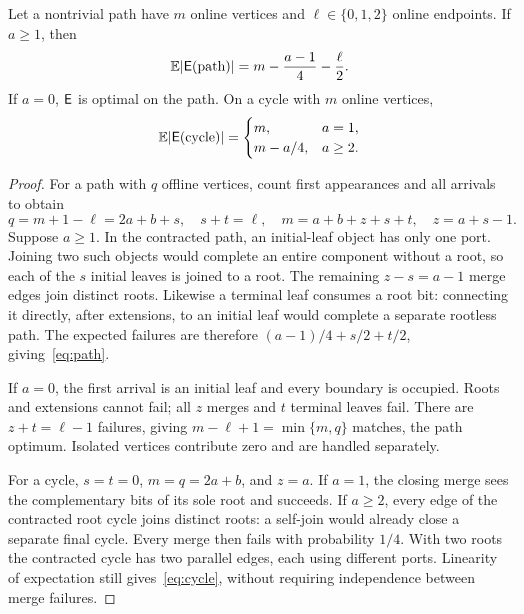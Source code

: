 \begin{lemma}\label{lem:expectations}
Let a nontrivial path have $m$ online vertices and $\ell\in\{0,1,2\}$
online endpoints. If $a\ge1$, then
\begin{equation}\label{eq:path}
 \mathbb E|\mathsf{E}(\text{path})|=m-\frac{a-1}{4}-\frac{\ell}{2}.
\end{equation}
If $a=0$, $\mathsf{E}$ is optimal on the path. On a cycle with $m$ online
vertices,
\begin{equation}\label{eq:cycle}
 \mathbb E|\mathsf{E}(\text{cycle})|=
 \begin{cases}m,&a=1,\\m-a/4,&a\ge2.\end{cases}
\end{equation}
\end{lemma}
\begin{proof}
For a path with $q$ offline vertices, count first appearances and all
arrivals to obtain
\begin{equation}\label{eq:counts}
 q=m+1-\ell=2a+b+s,\quad s+t=\ell,\quad
 m=a+b+z+s+t,\quad z=a+s-1.
\end{equation}
Suppose $a\ge1$. In the contracted path, an initial-leaf object has only
one port. Joining two such objects would complete an entire component
without a root, so each of the $s$ initial leaves is joined to a root.
The remaining $z-s=a-1$ merge edges join distinct roots. Likewise a
terminal leaf consumes a root bit: connecting it directly, after
extensions, to an initial leaf would complete a separate rootless path.
The expected failures are therefore
$(a-1)/4+s/2+t/2$, giving~\eqref{eq:path}.

If $a=0$, the first arrival is an initial leaf and every boundary is
occupied. Roots and extensions cannot fail; all $z$ merges and $t$
terminal leaves fail. There are $z+t=\ell-1$ failures, giving
$m-\ell+1=\min\{m,q\}$ matches, the path optimum. Isolated vertices
contribute zero and are handled separately.

For a cycle, $s=t=0$, $m=q=2a+b$, and $z=a$.
If $a=1$, the closing merge sees the complementary bits of its sole root
and succeeds. If $a\ge2$, every edge of the contracted root cycle joins
distinct roots: a self-join would already close a separate final cycle.
Every merge then fails with probability $1/4$. With two roots the
contracted cycle has two parallel edges, each using different ports.
Linearity of expectation still gives~\eqref{eq:cycle}, without requiring
independence between merge failures.
\end{proof}

